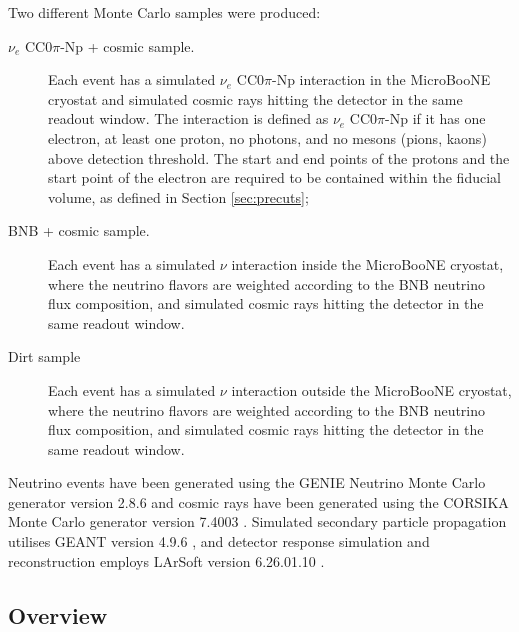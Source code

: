 Two different Monte Carlo samples were produced:
\begin{description}
\item[$\nu_{e}$ CC0$\pi$-Np + cosmic sample.] Each event has a simulated $\nu_{e}$ CC0$\pi$-Np interaction in the MicroBooNE cryostat and simulated cosmic rays hitting the detector in the same readout window. {The interaction is defined as $\nu_{e}$ CC0$\pi$-Np if it has one electron, at least one proton, no photons, and no mesons (pions, kaons) above detection threshold. The start and end points of the protons and the start point of the electron are required to be contained within the fiducial volume, as defined in Section \ref{sec:precuts}};
\item[BNB + cosmic sample.] Each event has a simulated $\nu$ interaction inside the MicroBooNE cryostat, where the neutrino flavors are weighted according to the BNB neutrino flux composition, and simulated cosmic rays hitting the detector in the same readout window.
\item[Dirt sample] {Each event has a simulated $\nu$ interaction outside the MicroBooNE cryostat, where the neutrino flavors are weighted according to the BNB neutrino flux composition, and simulated cosmic rays hitting the detector in the same readout window.}
\end{description}

Neutrino events have been generated using the GENIE Neutrino Monte Carlo generator version 2.8.6 \cite{genie} and cosmic rays have been generated using the CORSIKA Monte Carlo generator version 7.4003 \cite{corsika}. Simulated secondary particle propagation utilises GEANT version 4.9.6 \cite{geant}, and detector response simulation and reconstruction employs LArSoft version 6.26.01.10 \cite{larsoft}.

\subsection{Overview}

